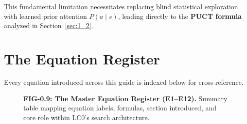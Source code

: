 This fundamental limitation necessitates replacing blind statistical exploration with learned prior attention $P(a \mid s)$, leading directly to the \textbf{PUCT formula} analyzed in Section~\ref{sec:1_2}.

\section{The Equation Register}
\label{sec:0_9}

Every equation introduced across this guide is indexed below for cross-reference.

\begin{figure}[htbp]
\centering

\caption{\textbf{FIG-0.9: The Master Equation Register (E1--E12).} Summary table mapping equation labels, formulas, section introduced, and core role within LC0's search architecture.}
\label{fig:0_9}
\end{figure}

